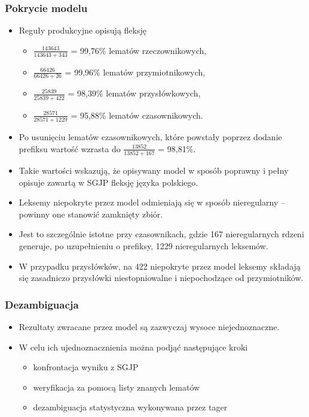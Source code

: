 \documentclass{beamer}
\begin{document}
\begin{frame}
\frametitle{Pokrycie modelu}
\begin{itemize}
\item Reguły produkcyjne opisują fleksję
\begin{itemize}
\item $\frac{143643}{143643+343}$ = 99,76\% lematów rzeczownikowych,
\item $\frac{66426}{66426+26}$ = 99,96\% lematów przymiotnikowych,
\item $\frac{25839}{25839+422}$ = 98,39\% lematów przysłówkowych,
\item $\frac{28571}{28571+1229}$ = 95,88\% lematów czasownikowych.
\end{itemize}
\item Po usunięciu lematów czasownikowych, które powstały poprzez dodanie prefiksu wartość wzrasta do $\frac{13852}{13852+167}$ = 98,81\%.
\item Takie wartości wskazują, że opisywany model w sposób poprawny i pełny opisuje zawartą w SGJP fleksję języka polskiego.
\item Leksemy niepokryte przez model odmieniają się w sposób nieregularny -- powinny one stanowić zamknięty zbiór.
\item Jest to szczególnie istotne przy czasownikach,
gdzie 167 nieregularnych rdzeni generuje, po uzupełnieniu o prefiksy, 1229 nieregularnych leksemów.
\item W przypadku przysłówków, na 422 niepokryte przez model leksemy składają się zasadniczo przysłówki niestopniowalne i niepochodzące od przymiotników.
\end{itemize}
\end{frame}

\begin{frame}
\frametitle{Dezambiguacja}
\begin{itemize}
\item Rezultaty zwracane przez model są zazwyczaj wysoce niejednoznaczne.
\item W celu ich ujednoznacznienia można podjąć następujące kroki
\begin{itemize}
\item konfrontacja wyniku z SGJP
\item weryfikacja za pomocą listy znanych lematów
\item dezambiguacja statystyczna wykonywana przez tager
\end{itemize}
\end{itemize}
\end{frame}
\end{document}
